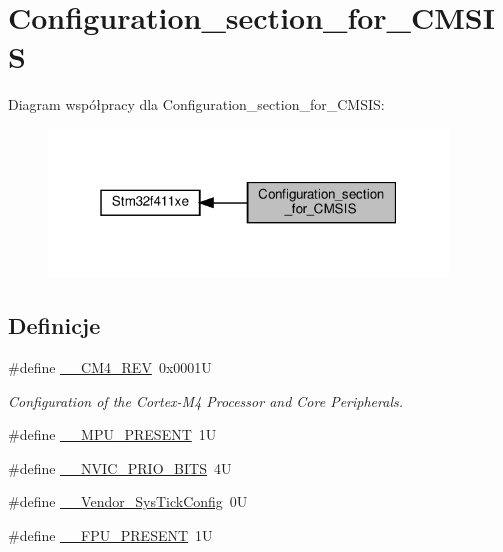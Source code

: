 \hypertarget{group___configuration__section__for___c_m_s_i_s}{}\section{Configuration\+\_\+section\+\_\+for\+\_\+\+C\+M\+S\+IS}
\label{group___configuration__section__for___c_m_s_i_s}
Diagram współpracy dla Configuration\+\_\+section\+\_\+for\+\_\+\+C\+M\+S\+IS\+:\nopagebreak
\begin{figure}[H]
\begin{center}
\leavevmode
\includegraphics[width=301pt]{group___configuration__section__for___c_m_s_i_s}
\end{center}
\end{figure}
\subsection*{Definicje}
\begin{DoxyCompactItemize}
\item 
\#define \hyperlink{group___configuration__section__for___c_m_s_i_s_ga45a97e4bb8b6ce7c334acc5f45ace3ba}{\+\_\+\+\_\+\+C\+M4\+\_\+\+R\+EV}~0x0001U
\begin{DoxyCompactList}\small\item\em Configuration of the Cortex-\/\+M4 Processor and Core Peripherals. \end{DoxyCompactList}\item 
\#define \hyperlink{group___configuration__section__for___c_m_s_i_s_ga4127d1b31aaf336fab3d7329d117f448}{\+\_\+\+\_\+\+M\+P\+U\+\_\+\+P\+R\+E\+S\+E\+NT}~1U
\item 
\#define \hyperlink{group___configuration__section__for___c_m_s_i_s_gae3fe3587d5100c787e02102ce3944460}{\+\_\+\+\_\+\+N\+V\+I\+C\+\_\+\+P\+R\+I\+O\+\_\+\+B\+I\+TS}~4U
\item 
\#define \hyperlink{group___configuration__section__for___c_m_s_i_s_gab58771b4ec03f9bdddc84770f7c95c68}{\+\_\+\+\_\+\+Vendor\+\_\+\+Sys\+Tick\+Config}~0U
\item 
\#define \hyperlink{group___configuration__section__for___c_m_s_i_s_gac1ba8a48ca926bddc88be9bfd7d42641}{\+\_\+\+\_\+\+F\+P\+U\+\_\+\+P\+R\+E\+S\+E\+NT}~1U
\end{DoxyCompactItemize}


